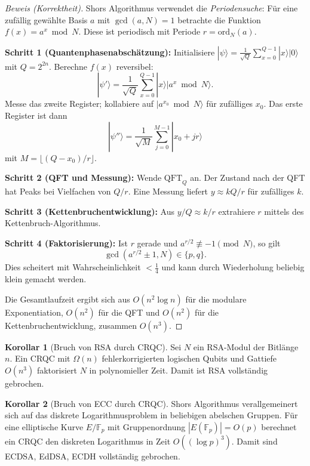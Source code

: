 ﻿\documentclass[a4paper,12pt]{article}
\theoremstyle{definition}
\newtheorem{korollar}{Korollar}[section]
\begin{document}
\begin{proof}[Beweis (Korrektheit)]
Shors Algorithmus verwendet die \emph{Periodensuche}: Für eine zufällig gewählte
Basis $a$ mit $\gcd(a, N) = 1$ betrachte die Funktion $f(x) = a^x \bmod N$.
Diese ist periodisch mit Periode $r = \mathrm{ord}_N(a)$.

\textbf{Schritt 1 (Quantenphasenabschätzung):}
Initialisiere $|\psi\rangle = \frac{1}{\sqrt{Q}} \sum_{x=0}^{Q-1} |x\rangle |0\rangle$
mit $Q = 2^{2n}$. Berechne $f(x)$ reversibel:
\[
  |\psi'\rangle = \frac{1}{\sqrt{Q}} \sum_{x=0}^{Q-1} |x\rangle |a^x \bmod N\rangle.
\]
Messe das zweite Register; kollabiere auf $|a^{x_0} \bmod N\rangle$ für
zufälliges $x_0$. Das erste Register ist dann
\[
  |\psi''\rangle = \frac{1}{\sqrt{M}} \sum_{j=0}^{M-1} |x_0 + jr\rangle
\]
mit $M = \lfloor (Q - x_0)/r \rfloor$.

\textbf{Schritt 2 (QFT und Messung):}
Wende $\mathrm{QFT}_Q$ an. Der Zustand nach der QFT hat Peaks bei
Vielfachen von $Q/r$. Eine Messung liefert $y \approx kQ/r$ für zufälliges $k$.

\textbf{Schritt 3 (Kettenbruchentwicklung):}
Aus $y/Q \approx k/r$ extrahiere $r$ mittels des Kettenbruch-Algorithmus.

\textbf{Schritt 4 (Faktorisierung):}
Ist $r$ gerade und $a^{r/2} \not\equiv -1 \pmod{N}$, so gilt
\[
  \gcd(a^{r/2} \pm 1, N) \in \{p, q\}.
\]
Dies scheitert mit Wahrscheinlichkeit $< \frac{1}{4}$ und kann durch Wiederholung
beliebig klein gemacht werden.

Die Gesamtlaufzeit ergibt sich aus $O(n^2 \log n)$ für die modulare Exponentiation,
$O(n^2)$ für die QFT und $O(n^2)$ für die Kettenbruchentwicklung, zusammen $O(n^3)$.
\end{proof}

\begin{korollar}[Bruch von RSA durch CRQC]
Sei $N$ ein RSA-Modul der Bitlänge $n$. Ein CRQC mit $\Omega(n)$ fehlerkorrigierten
logischen Qubits und Gattiefe $O(n^3)$ faktorisiert $N$ in polynomieller Zeit.
Damit ist RSA vollständig gebrochen.
\end{korollar}

\begin{korollar}[Bruch von ECC durch CRQC]
Shors Algorithmus verallgemeinert sich auf das diskrete Logarithmusproblem in
beliebigen abelschen Gruppen. Für eine elliptische Kurve $E/\mathbb{F}_p$ mit
Gruppenordnung $|E(\mathbb{F}_p)| = O(p)$ berechnet ein CRQC den diskreten
Logarithmus in Zeit $O((\log p)^3)$. Damit sind ECDSA, EdDSA, ECDH vollständig gebrochen.
\end{korollar}
\end{document}
